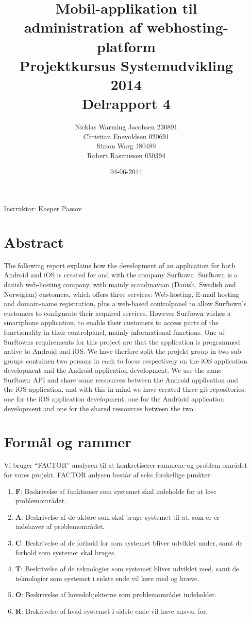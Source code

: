 \documentclass[12pt]{article}
\title{Mobil-applikation til administration af webhosting-platform\\Projektkursus Systemudvikling 2014\\Delrapport 4}
\date{04-06-2014}
\author{Nicklas Warming Jacobsen 230891\\Christian Enevoldsen 020691\\Simon Warg 180489\\Robert Rasmussen 050394}
\begin{document}
\maketitle
\begin{center}
  Instruktor: Kasper Passov
\end{center}
\newpage
\tableofcontents
\newpage
\section{Abstract}
The following report explains how the development of an application for both Android and iOS is created for and with the company Surftown. Surftown is a danish web-hosting company, with mainly scandinavian (Danish, Swedish and Norwigian) customers, which offers three services: Web-hosting, E-mail hosting and domain-name registration, plus a web-based controlpanel to allow Surftown's customers to configurate their acquired services. However Surftown wishes a smartphone application, to enable their customers to access parts of the functionality in their controlpanel, mainly informational functions.
One of Surftowns requirements for this project are that the application is programmed native to Android and iOS. We have therfore split the projekt group in two sub-groups containen two persons in each to focus respectively on the iOS application development and the Android application development. We use the same Surftown API and share some ressources between the Android application and the iOS application, and with this in mind we have created three git repositories; one for the iOS application development, one for the Andrioid application development and one for the shared ressources between the two.

\section{Formål og rammer}
Vi bruger ``FACTOR'' \cite{factor} analysen til at konkretiserer rammene og problem området for vores projekt.
FACTOR anlysen består af seks forskellige punkter:
\begin{enumerate}
	\item{\textbf{F}: Beskrivelse af funktioner som systemet skal indeholde for at løse problemområdet.}	
	\item{\textbf{A}: Beskrivelse af de aktøre som skal bruge systemet til at, som er er indehaver af problemområdet.}
	\item{\textbf{C}: Beskrivelse af de forhold for som systemet bliver udviklet under, samt de forhold som systemet skal bruges. }
	\item{\textbf{T}: Beskrivelse af de teknologier som systemet bliver udviklet med, samt de teknologier som systemet i sidste ende vil køre med og kræve.}
	\item{\textbf{O}: Beskrivelse af hovedobjekterne som problemområdet indeholder.}
	\item{\textbf{R}: Brskrivelse af hvad systemet i sidste ende vil have ansvar for.}

\end{enumerate}
\end{document}
